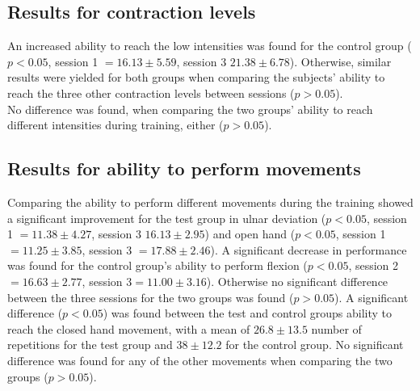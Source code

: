 \subsection{Results for contraction levels}
An increased ability to reach the low intensities was found for the control group ($p < 0.05$, session 1 $ = 16.13 \pm 5.59$, session 3 $ 21.38 \pm 6.78$). Otherwise, similar results were yielded for both groups when comparing the subjects' ability to reach the three other contraction levels between sessions ($p > 0.05$).\\ No difference was found, when comparing the two groups' ability to reach different intensities during training, either ($p > 0.05$).

\subsection{Results for ability to perform movements}
Comparing the ability to perform different movements during the training showed a significant improvement for the test group in ulnar deviation ($p < 0.05$, session 1 $ = 11.38 \pm 4.27$, session 3 $ 16.13 \pm 2.95$) and open hand ($p < 0.05$, session 1 $ = 11.25 \pm 3.85$, session 3 $ = 17.88 \pm 2.46$). A significant decrease in performance was found for the control group's ability to perform flexion ($p < 0.05$, session 2$ = 16.63 \pm 2.77$, session 3$ = 11.00 \pm 3.16$). Otherwise no significant difference between the three sessions for the two groups was found ($p > 0.05$). 
A significant difference ($p < 0.05$) was found between the test and control groups ability to reach the closed hand movement, with a mean of $26.8 \pm13.5$ number of repetitions for the test group and $38 \pm12.2$ for the control group. No significant difference was found for any of the other movements when comparing the two groups ($p > 0.05$).
%
